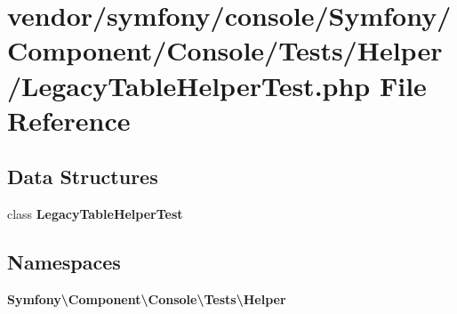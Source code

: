\section{vendor/symfony/console/\+Symfony/\+Component/\+Console/\+Tests/\+Helper/\+Legacy\+Table\+Helper\+Test.php File Reference}
\label{_legacy_table_helper_test_8php}
\subsection*{Data Structures}
\begin{DoxyCompactItemize}
\item 
class {\bf Legacy\+Table\+Helper\+Test}
\end{DoxyCompactItemize}
\subsection*{Namespaces}
\begin{DoxyCompactItemize}
\item 
 {\bf Symfony\textbackslash{}\+Component\textbackslash{}\+Console\textbackslash{}\+Tests\textbackslash{}\+Helper}
\end{DoxyCompactItemize}
